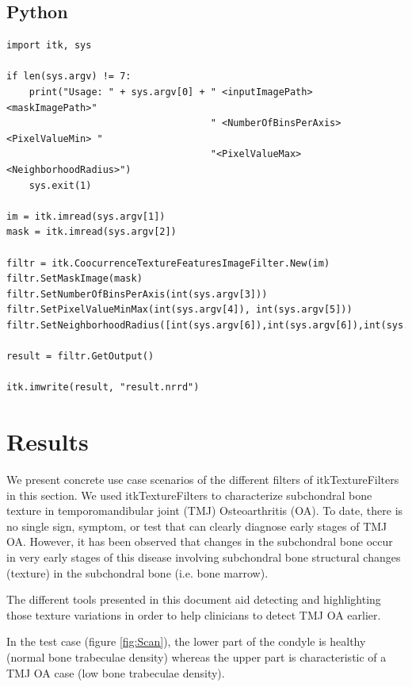 \documentclass{InsightArticle}
\begin{document}
\subsection{Python}
\label{sec:pythonEx}

\begin{verbatim}
import itk, sys

if len(sys.argv) != 7:
    print("Usage: " + sys.argv[0] + " <inputImagePath> <maskImagePath>"
                                    " <NumberOfBinsPerAxis> <PixelValueMin> "
                                    "<PixelValueMax> <NeighborhoodRadius>")
    sys.exit(1)

im = itk.imread(sys.argv[1])
mask = itk.imread(sys.argv[2])

filtr = itk.CoocurrenceTextureFeaturesImageFilter.New(im)
filtr.SetMaskImage(mask)
filtr.SetNumberOfBinsPerAxis(int(sys.argv[3]))
filtr.SetPixelValueMinMax(int(sys.argv[4]), int(sys.argv[5]))
filtr.SetNeighborhoodRadius([int(sys.argv[6]),int(sys.argv[6]),int(sys.argv[6])])

result = filtr.GetOutput()

itk.imwrite(result, "result.nrrd")
\end{verbatim}
\normalsize
\newpage
\section{Results}
\label{sec:results}

We present concrete use case scenarios of the different filters of itkTextureFilters in this section. We used itkTextureFilters to characterize subchondral bone texture in temporomandibular joint (TMJ) Osteoarthritis (OA). To date, there is no single sign, symptom, or test that can clearly diagnose early stages of TMJ OA. However, it has been observed that changes in the subchondral bone occur in very early stages of this disease involving subchondral bone structural changes (texture) in the subchondral bone (i.e. bone marrow).

The different tools presented in this document aid detecting and highlighting those texture variations in order to help clinicians to detect  TMJ OA earlier.

In the test case (figure \ref{fig:Scan}), the lower part of the condyle is healthy (normal bone trabeculae density) whereas the upper part is characteristic of a TMJ OA case (low bone trabeculae density).
\end{document}
